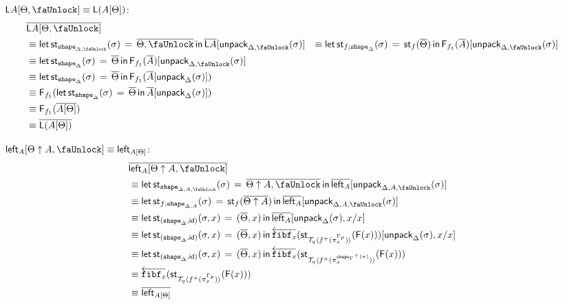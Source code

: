 \documentclass[10pt]{article}
\theoremstyle{definition}
\newcommand{\id}{\mathsf{id}}
\newcommand{\rewrite}[2]{\overleftarrow{#1}(#2)}
\newcommand\F[2]{\ensuremath{\mathsf{F}_{#1}(#2)}}
\newcommand\StI[2]{\ensuremath{\mathsf{st}_{#1}(#2)}}
\newcommand\StE[4]{\ensuremath{\mathsf{let} \, \StI{#1}{#3} \, = \, {#2} \, \mathsf{in} \, #4}}
\newcommand\FI[1]{\ensuremath{\mathsf{F}{(#1)}}}
\newcommand\TrPlus[2]{\ensuremath{{#1}^+(#2)}}
\newcommand\ApEl[2]{\mathcal{T}_{#1}\langle#2\rangle}
\newcommand\unpack[2]{\ensuremath{\mathsf{unpack}_{#1}(#2)}}
\newcommand{\modeof}[1]{{#1}_p}
\newcommand{\tshape}[1]{\ensuremath{\mathtt{shape}_{#1}}}
\newcommand{\upstairs}[1]{\overline{#1}}
\newcommand\fibf[1]{\ensuremath{\mathtt{fibf}_{#1}}}
\newcommand{\lock}{\text{\faUnlock}}
\newcommand{\Ltype}[1]{\mathsf{L}{#1}}
\newcommand{\LI}[1]{\mathsf{left}_{#1}}
\begin{document}
\begin{enumerate}[style = multiline, labelwidth = 80pt]
\item[{$\Ltype{A}[\Theta, \lock] \equiv \Ltype{(A[\Theta])}$}:]
\begin{align*}
&\upstairs{\Ltype{A}[\Theta, \lock]} \\
&\equiv \StE{\tshape{\Delta, \lock}}{\upstairs{\Theta, \lock}}{\sigma}{\upstairs{\Ltype{A}}[\unpack{\Delta, \lock}{\sigma}]}
&\equiv \StE{f;\tshape{\Delta}}{\StI{f}{\upstairs{\Theta}}}{\sigma}{ \F{f_1}{\upstairs{A}}[\unpack{\Delta, \lock}{\sigma}]}\\
&\equiv \StE{\tshape{\Delta}}{\upstairs{\Theta}}{\sigma}{ \F{f_1}{\upstairs{A}}[\unpack{\Delta, \lock}{\sigma}]}\\
&\equiv \StE{\tshape{\Delta}}{\upstairs{\Theta}}{\sigma}{
\F{f_1}{\upstairs{A}[\unpack{\Delta}{\sigma}]}}\\
&\equiv \F{f_1}{\StE{\tshape{\Delta}}{\upstairs{\Theta}}{\sigma}{\upstairs{A}[\unpack{\Delta}{\sigma}]}}\\
&\equiv \F{f_1}{\upstairs{A[\Theta]}} \\
&\equiv \upstairs{\Ltype{(A[\Theta])}}
\end{align*}

\item[{$\LI{A}[\Theta \uparrow A, \lock] \equiv \LI{A[\Theta]}$}:]
\begin{align*}
&\upstairs{\LI{A}[\Theta \uparrow A, \lock]} \\
&\equiv \StE{\tshape{\Delta, A, \lock}}{\upstairs{\Theta \uparrow A, \lock}}{\sigma}{\upstairs{\LI{A}}[\unpack{\Delta, A, \lock}{\sigma}]} \\
&\equiv \StE{f;\tshape{\Delta, A}}{\StI{f}{\upstairs{\Theta \uparrow A}}}{\sigma}{\upstairs{\LI{A}}[\unpack{\Delta, A, \lock}{\sigma}]} \\
&\equiv \StE{(\tshape{\Delta}, \id)}{(\upstairs{\Theta}, x)}{\sigma, x}{\upstairs{\LI{A}}[\unpack{\Delta}{\sigma}, x/x]} \\
&\equiv \StE{(\tshape{\Delta}, \id)}{(\upstairs{\Theta}, x)}{\sigma, x}{\rewrite{\fibf{x}}{\StI{\ApEl{q}{\TrPlus{f}{\pi^{\modeof{\Gamma}}_x}}}{\FI{x}}}[\unpack{\Delta}{\sigma}, x/x]} \\
&\equiv \StE{(\tshape{\Delta}, \id)}{(\upstairs{\Theta}, x)}{\sigma, x}{\rewrite{\fibf{x}}{\StI{\ApEl{q}{\TrPlus{f}{\pi^{\TrPlus{\tshape{\Gamma}}{\sigma}}_x}}}{\FI{x}}}} \\
&\equiv \rewrite{\fibf{x}}{\StI{\ApEl{q}{\TrPlus{f}{\pi^{\modeof{\Gamma}}_x}}}{\FI{x}}} \\
&\equiv \upstairs{\LI{A[\Theta]}}
\end{align*}


\end{enumerate}
\end{document}
